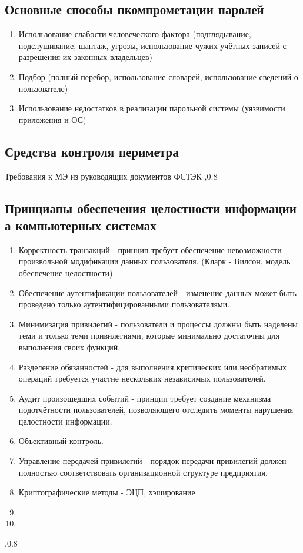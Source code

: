 \documentclass[a4paper,12pt]{report}
\begin{document}
			\subsection{Основные способы пкомпрометации паролей}
				\begin{enumerate}
					\item	Использование слабости человеческого фактора (подглядывание, подслушивание, шантаж, угрозы, использование чужих учётных записей с разрешения их законных владельцев)
					\item 	Подбор (полный перебор, использование словарей, использование сведений о пользователе)
					\item	Использование недостатков в реализации парольной системы (уязвимости приложения и ОС)
				\end{enumerate}
					
	\subsection{Средства контроля периметра}
		Требования к МЭ из руководящих документов ФСТЭК	
		,0.8
		
	\subsection{Принциапы обеспечения целостности информации а компьютерных системах}
		\begin{enumerate}
			\item	Корректность транзакций - принцип требует обеспечение невозможности произвольной модификации данных пользователя. (Кларк - Вилсон, модель обеспечение целостности)
			\item	Обеспечение аутентификации пользователей - изменение данных может быть проведено только аутентифицированными пользователями.
			\item	Минимизация привилегий - пользователи и процессы должны быть наделены теми и только теми привилегиями, которые минимально достаточны для выполнения своих функций.
			\item	Разделение обязанностей - для выполнения критических или необратимых операций требуется участие нескольких независимых пользователей.
			\item	Аудит произошедших событий - принцип требует создание механизма подотчётности пользователей, позволяющего отследить моменты нарушения целостности информации.
			\item	Объективный контроль.
			\item	Управление передачей привилегий - порядок передачи привилегий должен полностью соответствовать организационной структуре предприятия.
			\item	Криптографические методы - ЭЦП, хэширование
			\item	
			\item	
		\end{enumerate}
	,0.8
		
\end{document}

